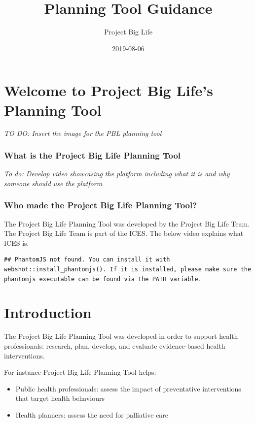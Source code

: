 \documentclass[]{book}
\title{Planning Tool Guidance}
\author{Project Big Life}
\date{2019-08-06}
\providecommand{\tightlist}{%
  \setlength{\itemsep}{0pt}\setlength{\parskip}{0pt}}
\begin{document}
\maketitle

{
\setcounter{tocdepth}{1}
\tableofcontents
}
\chapter{Welcome to Project Big Life's Planning
Tool}\label{welcome-to-project-big-lifes-planning-tool}

\emph{TO DO: Insert the image for the PBL planning tool}

\subsection{What is the Project Big Life Planning
Tool}\label{what-is-the-project-big-life-planning-tool}

\emph{To do: Develop video showcasing the platform including what it is
and why someone should use the platform}

\subsection{Who made the Project Big Life Planning
Tool?}\label{who-made-the-project-big-life-planning-tool}

The Project Big Life Planning Tool was developed by the Project Big Life
Team. The Project Big Life Team is part of the ICES. The below video
explains what ICES is.

\begin{verbatim}
## PhantomJS not found. You can install it with webshot::install_phantomjs(). If it is installed, please make sure the phantomjs executable can be found via the PATH variable.
\end{verbatim}

\chapter{Introduction}\label{introduction}

The Project Big Life Planning Tool was developed in order to support
health professionals: research, plan, develop, and evaluate
evidence-based health interventions.

For instance Project Big Life Planning Tool helps:

\begin{itemize}
\tightlist
\item
  Public health professionals: assess the impact of preventative
  interventions that target health behaviours
\item
  Health planners: assess the need for palliative care
\end{itemize}
\end{document}
